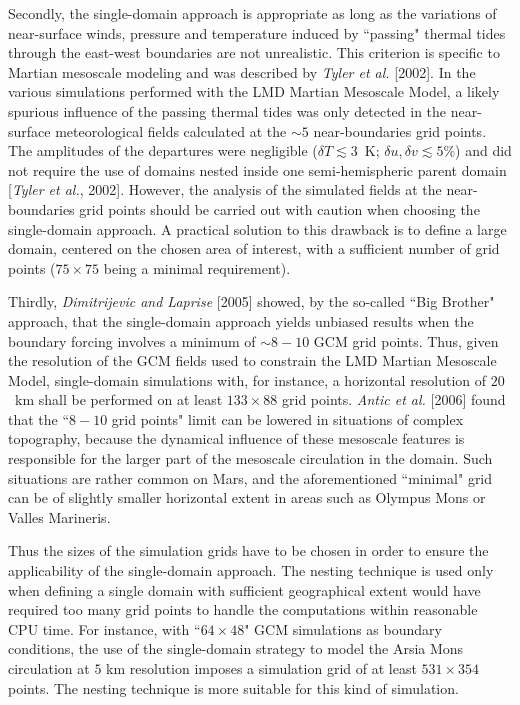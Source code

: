 \sk
Secondly, the single-domain approach is appropriate as long as the variations of near-surface winds, pressure and temperature induced by ``passing" thermal tides through the east-west boundaries are not unrealistic. This criterion is specific to Martian mesoscale modeling and was described by \textit{Tyler et al.} [2002]. In the various simulations performed with the LMD Martian Mesoscale Model, a likely spurious influence of the passing thermal tides was only detected in the near-surface meteorological fields calculated at the $\sim 5$ near-boundaries grid points. The amplitudes of the departures were negligible ($\delta T \apprle 3$~K; $\delta u, \delta v \apprle 5\%$) and did not require the use of domains nested inside one semi-hemispheric parent domain [\textit{Tyler et al.}, 2002]. However, the analysis of the simulated fields at the near-boundaries grid points should be carried out with caution when choosing the single-domain approach. A practical solution to this drawback is to define a large domain, centered on the chosen area of interest, with a sufficient number of grid points ($75 \times 75$ being a minimal requirement).

\sk
Thirdly, \textit{Dimitrijevic and Laprise} [2005]\nocite{Dimi:05} showed, by the so-called ``Big Brother" approach, that the single-domain approach yields unbiased results when the boundary forcing involves a minimum of $\sim 8-10$ GCM grid points. Thus, given the resolution of the GCM fields used to constrain the LMD Martian Mesoscale Model, single-domain simulations with, for instance, a horizontal resolution of $20$~km shall be performed on at least $133 \times 88$ grid points. \textit{Antic et al.} [2006]\nocite{Anti:06} found that the ``$8-10$ grid points" limit can be lowered in situations of complex topography, because the dynamical influence of these mesoscale features is responsible for the larger part of the mesoscale circulation in the domain. Such situations are rather common on Mars, and the aforementioned ``minimal" grid can be of slightly smaller horizontal extent in areas such as Olympus Mons or Valles Marineris.

\sk
Thus the sizes of the simulation grids have to be chosen in order to ensure the applicability of the single-domain approach. The nesting technique is used only when defining a single domain with sufficient geographical extent would have required too many grid points to handle the computations within reasonable CPU time. For instance, with ``$64 \times 48$" GCM simulations as boundary conditions, the use of the single-domain strategy to model the Arsia Mons circulation at $5$ km resolution imposes a simulation grid of at least $531 \times 354$ points. The nesting technique is more suitable for this kind of simulation.

